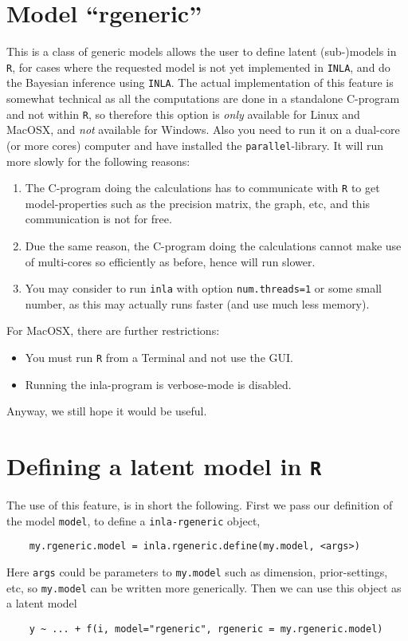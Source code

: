 \documentclass[a4paper,11pt]{article}
\begin{document}
\section*{Model ``rgeneric''}


This is a class of generic models allows the user to define latent
(sub-)models in \texttt{R}, for cases where the requested model is not
yet implemented in \texttt{INLA}, and do the Bayesian inference using
\texttt{INLA}. 
The actual implementation of this feature is somewhat technical as all
the computations are done in a standalone C-program and not within
\texttt{R}, so therefore this option is \emph{only} available for
Linux and MacOSX, and \emph{not} available for Windows. Also you need
to run it on a dual-core (or more cores) computer and have installed
the \texttt{parallel}-library. It will run more slowly for the
following reasons:
\begin{enumerate}
\item The C-program doing the calculations has to communicate with
    \texttt{R} to get model-properties such as the precision matrix,
    the graph, etc, and this communication is not for free.
\item Due the same reason, the C-program doing the calculations cannot
    make use of multi-cores so efficiently as before, hence will run
    slower.
\item You may consider to run \texttt{inla} with option
    \texttt{num.threads=1} or some small number, as this may actually
    runs faster (and use much less memory).
\end{enumerate}
For MacOSX, there are further restrictions:
\begin{itemize}
\item You must run \texttt{R} from a Terminal and not use the GUI.
\item Running the inla-program is verbose-mode is disabled.
\end{itemize}
Anyway, we still hope it would be useful.

\section*{Defining a latent model in \texttt{R}}

The use of this feature, is in short the following. First we pass our
definition of the model \texttt{model}, to define a
\texttt{inla-rgeneric} object,
\begin{verbatim}
    my.rgeneric.model = inla.rgeneric.define(my.model, <args>)
\end{verbatim}
Here \texttt{args} could be parameters to \texttt{my.model}
such as dimension, prior-settings, etc, so \texttt{my.model} can
be written more generically.  Then we can use this object as a latent
model
\begin{verbatim}
    y ~ ... + f(i, model="rgeneric", rgeneric = my.rgeneric.model)
\end{verbatim}
\end{document}
